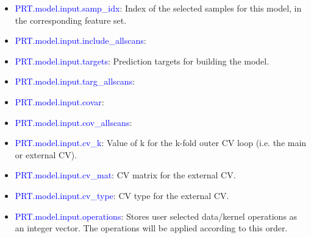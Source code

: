 \begin{itemize}
\begin{itemize}
\item It's a structure of size number of classes (classification) or 1 (regression). It specifies the groups, subjects within that group and conditions for each class, with a similar structure as in \textcolor{blue}{PRT.group} (without the modalities). And we identify which indices in the global ID matrix are selected to build the specified class.
\item The CV matrix and everything else are built from here. This can be viewed in Review kernel \& CV. Note: it’s always good to have a check on the CV matrix to ensure the inputs do what you want. You can also make a CV matrix yourself and input via Custom choice in Cross-validation scheme. In the Review module, you can view the classes specified.
\end{itemize}


\item \textcolor{blue}{PRT.model.input.samp\_idx}: Index of the selected samples for this model, in the corresponding feature set.

\item \textcolor{blue}{PRT.model.input.include\_allscans}:


\item \textcolor{blue}{PRT.model.input.targets}: Prediction targets for building the model.

\item \textcolor{blue}{PRT.model.input.targ\_allscans}:

\item \textcolor{blue}{PRT.model.input.covar}:

\item \textcolor{blue}{PRT.model.input.cov\_allscans}:

\item \textcolor{blue}{PRT.model.input.cv\_k}: Value of k for the k-fold outer CV loop (i.e. the main or external CV).

\item \textcolor{blue}{PRT.model.input.cv\_mat}: CV matrix for the external CV.

\item \textcolor{blue}{PRT.model.input.cv\_type}: CV type for the external CV.

\item \textcolor{blue}{PRT.model.input.operations}: Stores user selected data/kernel operations as an integer vector. The operations will be applied according to this order. 
 
\end{itemize} 

